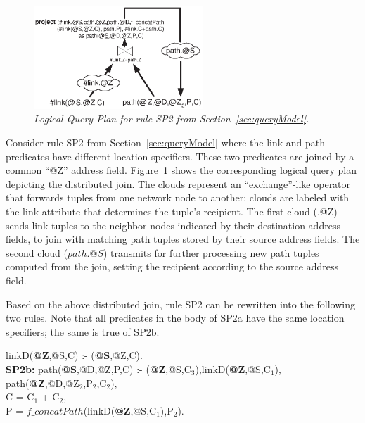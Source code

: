 \begin{figure}[ht]
\centering
\includegraphics[width=2.5in]{images/reachable.eps}
\caption{\label{Right Reachable}\emph{\small Logical Query Plan for rule SP2 from Section~\ref{sec:queryModel}.}}
\end{figure}                                              

Consider rule SP2 from Section~\ref{sec:queryModel}
where the link and path predicates have different location specifiers. These two
predicates are joined by a common ``@Z'' address
field. Figure~\ref{Right Reachable} shows the corresponding logical
query plan depicting the distributed join. The clouds represent an
``exchange''-like operator~\cite{volcano} that forwards tuples from one
network node to another; clouds are labeled with the link attribute that
determines the tuple's recipient. The
first cloud (\link.@Z) sends link tuples to the neighbor nodes indicated by their
destination address fields, %
to join with matching path
tuples stored by their source address fields. The second cloud
($path.@S$) transmits for further processing new path tuples computed
from the join, setting the recipient according to the source address field.

Based on the above distributed join, rule SP2 can be rewritten into
the following two rules. Note that all
predicates in the body of SP2a have the same location specifiers;
the same is true of SP2b.


\vspace{2pt} 
{\small
{} linkD({\bf @Z},@S,C) :- \link({\bf @S},@Z,C).\\
{\bf SP2b: } path({\bf @S},@D,@Z,P,C) :- \link({\bf @Z},@S,C$_{3}$),linkD({\bf @Z},@S,C$_{1}$), \\
\datalogspace path({\bf @Z},@D,@Z$_{2}$,P$_{2}$,C$_{2}$),\\
\datalogspace C = C$_{1}$ + C$_{2}$, \\                              
\datalogspace P =
$f\_concatPath$(linkD({\bf @Z},@S,C$_{1}$),P$_{2}$).}
\vspace{2pt} 

